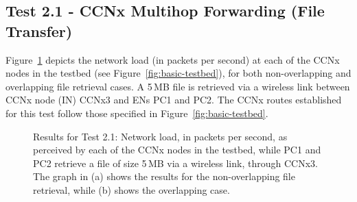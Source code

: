 \subsection{Test 2.1 - CCNx Multihop Forwarding (File Transfer)}
\label{subsec:test-multihop-file-res}

Figure~\ref{fig:file_5-net} depicts the network load (in packets per 
second) at each of the CCNx nodes 
in the testbed (see Figure~\ref{fig:basic-testbed}), for both non-overlapping and 
overlapping file retrieval cases. A 5\,MB file is retrieved via a wireless 
link between CCNx node (IN) CCNx3 and ENs PC1 and PC2. The CCNx 
routes established for this test follow those specified in Figure~\ref{fig:basic-testbed}.\vertbreak

\begin{figure}[h!]
    \centering



    \cprotect\caption{Results for Test 2.1: Network load, in packets per 
        second, as perceived by each of the CCNx nodes in the testbed, 
        while PC1 and PC2 retrieve a file of size 5\,MB via a wireless 
        link, through CCNx3. The graph in (a) shows the results for 
        the non-overlapping file retrieval, while (b) shows the 
        overlapping case.}
    \label{fig:file_5-net}

\end{figure}


